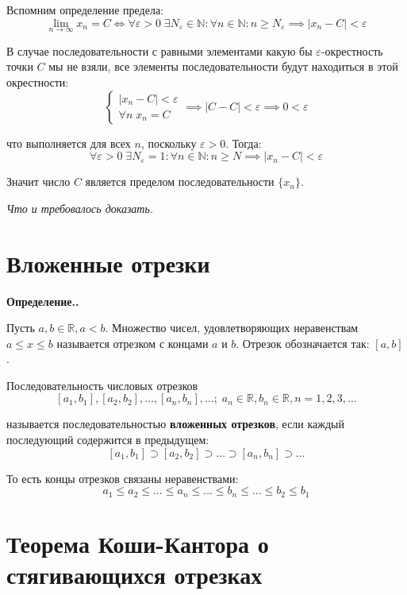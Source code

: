 \documentclass[a4paper,12pt,oneside]{extbook}
\newcommand{\newpar}{$ $\par\nobreak\ignorespaces}
\newenvironment{definition}[1][]{\noindent\textbf{Определение.\if\relax\detokenize{#1}\relax\else\;#1.\fi}\newpar}{\bigskip}
\theoremstyle{numbered}
\theoremstyle{unnumbered}
\theoremstyle{named}
\theoremstyle{unnumbered}
\theoremstyle{named}
\theoremstyle{named}
\theoremstyle{named}
\renewenvironment{proof}[1][]{\breakenv[Доказательство]{\if\relax\detokenize{#1}\relax\else\;\fi}{\textbf{#1}}}{\smallskip\newpar \hfill\textit{Что и требовалось доказать.}}
\begin{document}
\begin{proof}
    Вспомним определение предела:
    \[
        \lim_{n \to \infty}{x_n} = C \iff
        \forall \varepsilon > 0 \; \exists N_{\varepsilon} \in \mathbb{N}: \forall n \in \mathbb{N}: n \geq N_{\varepsilon} \implies |x_n - C| < \varepsilon
    \]

    В случае последовательности с равными элементами какую бы \(\varepsilon\)-окрестность точки \(C\) мы не взяли, все элементы последовательности будут находиться в этой окрестности:
    \[
        \begin{cases}
            |x_n - C| < \varepsilon \\
            \forall n \; x_n = C
        \end{cases}
        \implies
        |C - C| < \varepsilon
        \implies
        0 < \varepsilon
    \]

    что выполняется для всех \(n\), поскольку \(\varepsilon > 0\). Тогда:
    \[
        \forall \varepsilon > 0 \; \exists N_{\varepsilon} = 1: \forall n \in \mathbb{N}: n \geq N \implies |x_n - C| < \varepsilon
    \]

    Значит число \(C\) является пределом последовательности \(\{x_n\}\).
\end{proof}

\section{Вложенные отрезки}%
\label{sec:Вложенные отрезки}

\begin{definition}
    Пусть \(a, b \in \mathbb{R}, a < b\). Множество чисел, удовлетворяющих неравенствам \(a \leq x \leq b\) называется отрезком с концами \(a\) и \(b\). Отрезок обозначается так: \([a, b]\).
\end{definition}

Последовательность числовых отрезков
\[
    [a_1, b_1], [a_2, b_2], \ldots, [a_n, b_n], \ldots; \; a_n \in \mathbb{R}, b_n \in \mathbb{R}, n = 1, 2, 3, \ldots
\]

называется последовательностью \textbf{вложенных отрезков}, если каждый последующий содержится в предыдущем:
\[
    [a_1, b_1] \supset [a_2, b_2] \supset \ldots \supset [a_n, b_n] \supset \ldots
\]

То есть концы отрезков связаны неравенствами:
\[
    a_1 \leq a_2 \leq \ldots \leq a_n \leq \ldots \leq b_n \leq \ldots \leq b_2 \leq b_1
\]

\section{Теорема Коши-Кантора о стягивающихся отрезках}%
\label{sec:Теорема Коши-Кантора о стягивающихся отрезках}
\end{document}
